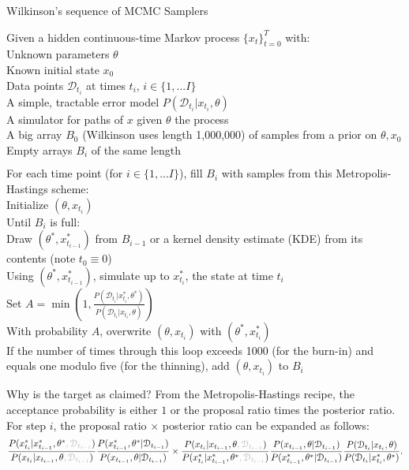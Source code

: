 \documentclass{article}
\begin{document}
\begin{algorithm}[h]
\caption{ \label{pMCMC} Wilkinson's sequence of MCMC Samplers}
Given a hidden continuous-time Markov process $\{x_t\}_{t=0}^T$ with: \\
\Indp \Indp
Unknown parameters $\theta$\\
Known initial state $x_0$\\
Data points $\mathcal{D}_{t_{i}}$ at times $t_{i}$, $i \in \{1, ... I\}$ \\
A simple, tractable error model $P(\mathcal{D}_{t_{i}}|x_{t_{i}}, \theta)$\\
A simulator for paths of $x$ given $\theta$ the process\\
A big array $B_0$ (Wilkinson uses length 1,000,000) of samples from a prior on $\theta, x_0$\\
Empty arrays $B_{i}$ of the same length\\
$\phantom{0}$\\
\Indm \Indm
For each time point (for $i \in \{1, ... I\}$), fill $B_{i}$ with samples from this Metropolis-Hastings scheme:\\
\Indp\Indp
Initialize $(\theta, x_{t_{i}})$ \\
Until $B_{i}$ is full: \\
\Indp\Indp
Draw $(\theta^*, x_{t_{i-1}}^*)$ from $B_{i-1}$ or a kernel density estimate (KDE) from its contents (note $t_0\equiv0$)\\
Using $(\theta^*, x_{t_{i-1}}^*)$, simulate up to $x_{t_{i}}^*$, the state at time $t_{i}$ \\
Set $A=\min(1, \frac{P(\mathcal{D}_{t_{i}}|x_{t_{i}}^*, \theta^*)}{P(\mathcal{D}_{t_{i}}|x_{t_{i}}, \theta)})$\\
With probability $A$, overwrite $(\theta, x_{t_{i}})$ with $(\theta^*, x_{t_{i}}^*)$\\
If the number of times through this loop exceeds 1000 (for the burn-in) and equals one modulo five (for the thinning), add $(\theta, x_{t_{i}})$ to $B_{i}$\\
\Indm \Indm
\end{algorithm}
\pagebreak
Why is the target as claimed? From the Metropolis-Hastings recipe, the acceptance probability is either $1$ or the proposal ratio times the posterior ratio. For step $i$, the proposal ratio $\times$ posterior ratio can be expanded as follows:
$$ \frac{P(x_{t_{i}}^*| x_{t_{i-1}}^*,\theta^*\gray{, \mathcal{D}_{t_{i-1}}})}{P(x_{t_{i}}| x_{t_{i-1}}, \theta \gray{, \mathcal{D}_{t_{i-1}}})} 
\frac{P(x_{t_{i-1}}^*,\theta^*| \mathcal{D}_{t_{i-1}})}{P(x_{t_{i-1}}, \theta| \mathcal{D}_{t_{i-1}})}
\times 
\frac{P(x_{t_{i}}| x_{t_{i-1}}, \theta \gray{, \mathcal{D}_{t_{i-1}}})}{P(x_{t_{i}}^*| x_{t_{i-1}}^*,\theta^*\gray{, \mathcal{D}_{t_{i-1}}})}
\frac{ P(x_{t_{i-1}}, \theta| \mathcal{D}_{t_{i-1}})}{ P( x_{t_{i-1}}^*,\theta^*| \mathcal{D}_{t_{i-1}})}   
\frac{P(\mathcal{D}_{t_{i}}|x_{t_{i}}, \theta)}{P(\mathcal{D}_{t_{i}}|x_{t_{i}}^*, \theta^*)}.$$   
\end{document}
